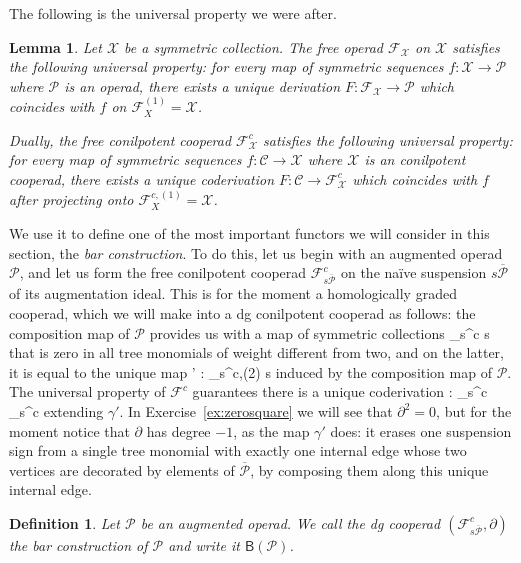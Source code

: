 \documentclass[fleqn, a4paper, twoside]{article}
\makeatletter
\newcommand{\0}{\langle 0\rangle}
\newcommand{\XX}{\mathcal{X}}
\newcommand{\FF}{\mathcal{F}}
\newcommand{\B}[1]{\mathsf{B}(#1)}
\let\[\@undefined
\DeclareRobustCommand{\[}{\begin{equation}}%
\let\]\@undefined
\DeclareRobustCommand{\]}{\end{equation}}%
\theoremstyle{mytheorem}
\newtheorem{lemma}[theorem]{Lemma}
\theoremstyle{introthm}
\theoremstyle{mydefinition}
\newtheorem{definition}[theorem]{Definition}
\theoremstyle{mydefinition2}
\theoremstyle{plain} %
\newcommand{\CC}{\mathcal{C}}
\newcommand{\?}{\,?\,}
\newcommand{\PP}{{\mathcal{P}}}
\theoremstyle{mytheorem}
\theoremstyle{plain} %
\makeatother
\begin{document}
The following is the universal property we were after.

\begin{lemma}
Let $\XX$ be a symmetric collection. The free operad $\FF_\XX$
on $\XX$ satisfies the following universal property: for every
map of symmetric sequences $f: \XX\longrightarrow \PP$ where $\PP$
is an operad, there exists a unique derivation $F: \FF_\XX
\longrightarrow \PP$ which coincides with $f$ on $\FF_X^{(1)}=\XX$.

Dually, the free conilpotent cooperad $\FF_\XX^c$ satisfies the following
universal property: for every
map of symmetric sequences $f: \CC\longrightarrow \XX$ where $\XX$
is an conilpotent cooperad, there exists a unique coderivation $F: \CC
\longrightarrow \FF_\XX^c$ which coincides with $f$ after
projecting onto $\FF_X^{c,(1)}=\XX$.
\end{lemma}

We use it to define one of the most important functors we will 
consider in this section, the \emph{bar construction}. To do this,
let us begin with an augmented operad $\PP$, and let us form
the free conilpotent cooperad $\FF_{s\overline{\PP}}^c$ on the
na\"ive suspension $s\overline{\PP}$ of its augmentation ideal.
This is for the moment a homologically graded cooperad, which we will
make into a dg conilpotent cooperad as follows: the composition
map of $\PP$ provides us with a map of symmetric collections
\[
\FF_{s\overline{\PP}}^c \longrightarrow s\overline\PP
\]
that is zero in all tree monomials of weight different from two, and
on the latter, it is equal to the unique map
\[
\gamma' :  \FF_{s\overline{\PP}}^{c,(2)} 
 \longrightarrow s\overline{\PP}
\]
induced by the composition map of $\PP$. The universal property of $\FF^c$
guarantees there is a unique coderivation 
\[ \partial : \FF_{s\overline{\PP}}^c 
	\longrightarrow \FF_{s\overline{\PP}}^c\]
extending $\gamma'$. In Exercise~\ref{ex:zerosquare} we will see that
$\partial^2 = 0$, but for the moment notice that $\partial$ has degree $-1$,
as the map $\gamma'$ does: it erases one suspension sign from 
a single tree monomial with exactly one internal edge whose
two vertices are decorated by elements of $\overline{\PP}$,
by composing them along this unique internal edge.

\begin{figure}

\end{figure}

\begin{definition}
Let $\PP$ be an augmented operad. 
We call the dg cooperad $(\FF_{s\overline{\PP}}^c ,\partial)$
the bar construction of $\PP$ and write it $\B{\PP}$.
\end{definition}
\end{document}
